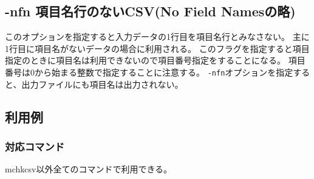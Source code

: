 
%

\subsection{-nfn 項目名行のないCSV(No Field Namesの略)\label{sect:option_nfn}}

このオプションを指定すると入力データの1行目を項目名行とみなさない。
主に1行目に項目名がないデータの場合に利用される。
このフラグを指定すると項目指定のときに項目名は利用できないので項目番号指定をすることになる。
項目番号は0から始まる整数で指定することに注意する。
\verb|-nfn|オプションを指定すると、出力ファイルにも項目名は出力されない。

\subsection*{利用例}


\subsubsection*{対応コマンド}
mchkcsv以外全てのコマンドで利用できる。

%

